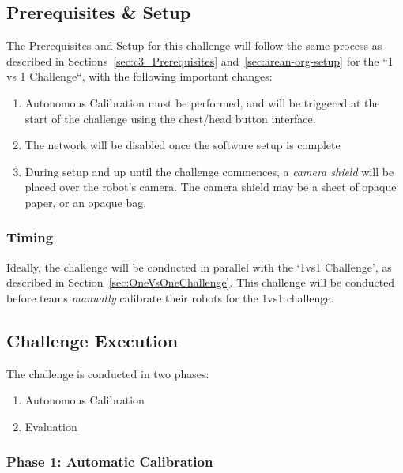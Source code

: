 \subsection{Prerequisites \& Setup}

The Prerequisites and Setup for this challenge will follow the same process as described in Sections~\ref{sec:c3_Prerequisites} and~\ref{sec:arean-org-setup} for the ``1 vs 1 Challenge``, with the following important changes:
\begin{enumerate}
    \item Autonomous Calibration must be performed, and will be triggered at the start of the challenge using the chest/head button interface. 
    \item The network will be disabled once the software setup is complete
    \item During setup and up until the challenge commences, a \textit{camera shield} will be placed over the robot's camera. The camera shield may be a sheet of opaque paper, or an opaque bag.
\end{enumerate}

\subsubsection{Timing}
Ideally, the challenge will be conducted in parallel with the `1vs1 Challenge', as described in Section~\ref{sec:OneVsOneChallenge}.
This challenge will be conducted before teams \textit{manually} calibrate their robots for the 1vs1 challenge. 

\subsection{Challenge Execution}

The challenge is conducted in two phases:
\begin{enumerate}
    \item Autonomous Calibration
    \item Evaluation
\end{enumerate}

\subsubsection{Phase 1: Automatic Calibration}

